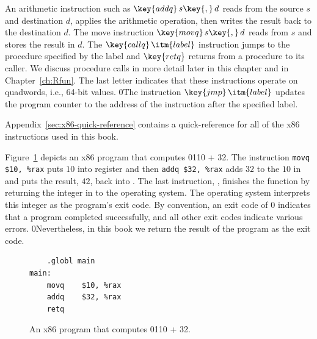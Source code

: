 \documentclass[7x10]{TimesAPriori_MIT}%
\def\racketEd{0}
\def\pythonEd{1}
\def\edition{1}
\newcommand{\racket}[1]{{\if\edition\racketEd{#1}\fi}}
\newcommand{\python}[1]{{\if\edition\pythonEd #1\fi}}
\begin{document}
An arithmetic instruction such as $\key{addq}\,s\key{,}\,d$ reads from the
source $s$ and destination $d$, applies the arithmetic operation, then
writes the result back to the destination $d$. 
%
The move instruction $\key{movq}\,s\key{,}\,d$ reads from $s$ and
stores the result in $d$.
%
The $\key{callq}\,\itm{label}$ instruction jumps to the procedure
specified by the label and $\key{retq}$ returns from a procedure to
its caller. 
%
We discuss procedure calls in more detail later in this chapter and in
Chapter~\ref{ch:Rfun}.
%
The last letter  indicates that these instructions operate on
quadwords, i.e., 64-bit values.
%
\racket{The instruction $\key{jmp}\,\itm{label}$ updates the program
  counter to the address of the instruction after the specified
  label.}

Appendix~\ref{sec:x86-quick-reference} contains a quick-reference for
all of the x86 instructions used in this book.

Figure~\ref{fig:p0-x86} depicts an x86 program that computes
\racket{}\python{10 + 32}. The instruction
\lstinline{movq $10, %rax}
puts $10$ into register  and then \lstinline{addq $32, %rax}
adds $32$ to the $10$ in  and
puts the result, $42$, back into .
%
The last instruction, , finishes the  function by
returning the integer in  to the operating system. The
operating system interprets this integer as the program's exit
code. By convention, an exit code of 0 indicates that a program
completed successfully, and all other exit codes indicate various
errors.
%
\racket{Nevertheless, in this book we return the result of the program
  as the exit code.}

\begin{figure}[tbp]
\begin{lstlisting}
	.globl main
main:
	movq	$10, %rax
	addq	$32, %rax
	retq
\end{lstlisting}
\caption{An x86 program that computes
  \racket{}\python{10 + 32}.}
\label{fig:p0-x86}
\end{figure}
\end{document}
